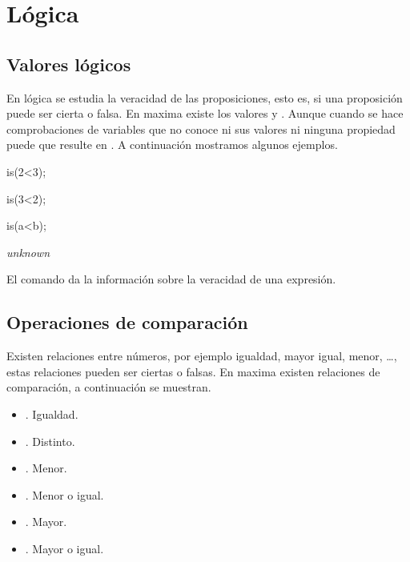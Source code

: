 
\section{Lógica}

\subsection*{Valores lógicos}

En lógica se estudia la veracidad de las proposiciones,
esto es, si una proposición puede ser cierta o falsa.
En maxima existe los valores
 y .
Aunque cuando se hace comprobaciones de variables que
no conoce ni sus valores ni ninguna propiedad puede que
resulte en .
A continuación mostramos algunos ejemplos.

\begin{maximai}
is(2<3);
\end{maximai}
\begin{maximao}
\end{maximao}

\begin{maximai}
is(3<2);
\end{maximai}
\begin{maximao}
\end{maximao}

\begin{maximai}
is(a<b);
\end{maximai}
\begin{maximao}
{\it unknown}
\end{maximao}

El comando  da la información sobre la veracidad
de una expresión.

\subsection*{Operaciones de comparación}

Existen relaciones entre números,
por ejemplo igualdad, mayor igual, menor, \ldots,
estas relaciones pueden ser ciertas o falsas.
En maxima existen relaciones de comparación, a continuación
se muestran.
\begin{itemize}
	\item \maximain{=}. Igualdad.
	\item \maximain{\#}. Distinto.
	\item \maximain{<}. Menor.
	\item \maximain{<=}. Menor o igual.
	\item \maximain{>}. Mayor.
	\item \maximain{>=}. Mayor o igual.
\end{itemize}

